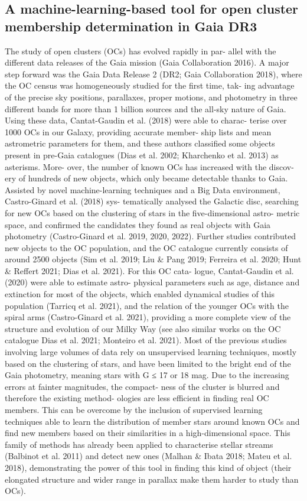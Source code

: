 \documentclass[../main.tex]{subfiles}
\begin{document}
\subsection{A machine-learning-based tool for open cluster membership determination in Gaia DR3} %
The study of open clusters (OCs) has evolved rapidly in par- allel with the different data releases of the Gaia mission (Gaia Collaboration 2016). A major step forward was the Gaia Data Release 2 (DR2; Gaia Collaboration 2018), where the OC census was homogeneously studied for the first time, tak- ing advantage of the precise sky positions, parallaxes, proper motions, and photometry in three different bands for more than 1 billion sources and the all-sky nature of Gaia. Using these data, Cantat-Gaudin et al. (2018) were able to charac- terise over 1000 OCs in our Galaxy, providing accurate member- ship lists and mean astrometric parameters for them, and these authors classified some objects present in pre-Gaia catalogues (Dias et al. 2002; Kharchenko et al. 2013) as asterisms. More- over, the number of known OCs has increased with the discov- ery of hundreds of new objects, which only became detectable thanks to Gaia. Assisted by novel machine-learning techniques and a Big Data environment, Castro-Ginard et al. (2018) sys- tematically analysed the Galactic disc, searching for new OCs based on the clustering of stars in the five-dimensional astro- metric space, and confirmed the candidates they found as real objects with Gaia photometry (Castro-Ginard et al. 2019, 2020, 2022). Further studies contributed new objects to the OC population, and the OC catalogue currently consists of around 2500 objects (Sim et al. 2019; Liu \& Pang 2019; Ferreira et al. 2020; Hunt \& Reffert 2021; Dias et al. 2021). For this OC cata- logue, Cantat-Gaudin et al. (2020) were able to estimate astro- physical parameters such as age, distance and extinction for most of the objects, which enabled dynamical studies of this population (Tarricq et al. 2021), and the relation of the younger OCs with the spiral arms (Castro-Ginard et al. 2021), providing a more complete view of the structure and evolution of our Milky Way (see also similar works on the OC catalogue Dias et al. 2021; Monteiro et al. 2021). Most of the previous studies involving large volumes of data rely on unsupervised learning techniques, mostly based on the clustering of stars, and have been limited to the bright end of the Gaia photometry, meaning stars with G ≤ 17 or 18 mag. Due to the increasing errors at fainter magnitudes, the compact- ness of the cluster is blurred and therefore the existing method- ologies are less efficient in finding real OC members. This can be overcome by the inclusion of supervised learning techniques able to learn the distribution of member stars around known OCs and find new members based on their similarities in a high-dimensional space. This family of methods has already been applied to characterise stellar streams (Balbinot et al. 2011) and detect new ones (Malhan \& Ibata 2018; Mateu et al. 2018), demonstrating the power of this tool in finding this kind of object (their elongated structure and wider range in parallax make them harder to study than OCs).
\end{document}
